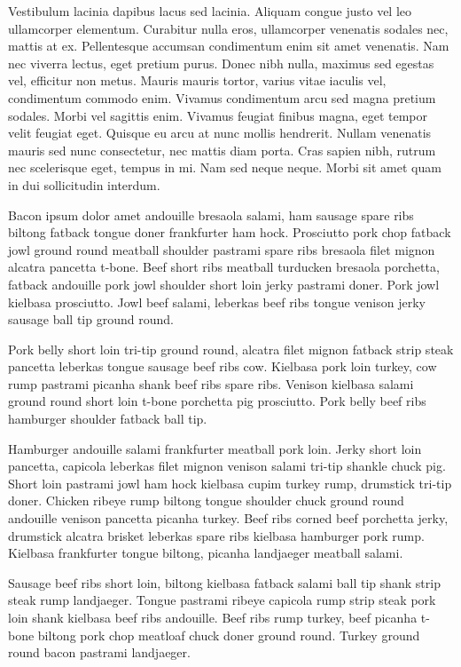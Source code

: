 Vestibulum lacinia dapibus lacus sed lacinia. Aliquam congue justo vel leo ullamcorper elementum. Curabitur nulla eros, ullamcorper venenatis sodales nec, mattis at ex. Pellentesque accumsan condimentum enim sit amet venenatis. Nam nec viverra lectus, eget pretium purus. Donec nibh nulla, maximus sed egestas vel, efficitur non metus. Mauris mauris tortor, varius vitae iaculis vel, condimentum commodo enim. Vivamus condimentum arcu sed magna pretium sodales. Morbi vel sagittis enim. Vivamus feugiat finibus magna, eget tempor velit feugiat eget. Quisque eu arcu at nunc mollis hendrerit. Nullam venenatis mauris sed nunc consectetur, nec mattis diam porta. Cras sapien nibh, rutrum nec scelerisque eget, tempus in mi. Nam sed neque neque. Morbi sit amet quam in dui sollicitudin interdum.

Bacon ipsum dolor amet andouille bresaola salami, ham sausage spare ribs biltong fatback tongue doner frankfurter ham hock. Prosciutto pork chop fatback jowl ground round meatball shoulder pastrami spare ribs bresaola filet mignon alcatra pancetta t-bone. Beef short ribs meatball turducken bresaola porchetta, fatback andouille pork jowl shoulder short loin jerky pastrami doner. Pork jowl kielbasa prosciutto. Jowl beef salami, leberkas beef ribs tongue venison jerky sausage ball tip ground round.

Pork belly short loin tri-tip ground round, alcatra filet mignon fatback strip steak pancetta leberkas tongue sausage beef ribs cow. Kielbasa pork loin turkey, cow rump pastrami picanha shank beef ribs spare ribs. Venison kielbasa salami ground round short loin t-bone porchetta pig prosciutto. Pork belly beef ribs hamburger shoulder fatback ball tip.

Hamburger andouille salami frankfurter meatball pork loin. Jerky short loin pancetta, capicola leberkas filet mignon venison salami tri-tip shankle chuck pig. Short loin pastrami jowl ham hock kielbasa cupim turkey rump, drumstick tri-tip doner. Chicken ribeye rump biltong tongue shoulder chuck ground round andouille venison pancetta picanha turkey. Beef ribs corned beef porchetta jerky, drumstick alcatra brisket leberkas spare ribs kielbasa hamburger pork rump. Kielbasa frankfurter tongue biltong, picanha landjaeger meatball salami.

Sausage beef ribs short loin, biltong kielbasa fatback salami ball tip shank strip steak rump landjaeger. Tongue pastrami ribeye capicola rump strip steak pork loin shank kielbasa beef ribs andouille. Beef ribs rump turkey, beef picanha t-bone biltong pork chop meatloaf chuck doner ground round. Turkey ground round bacon pastrami landjaeger.

